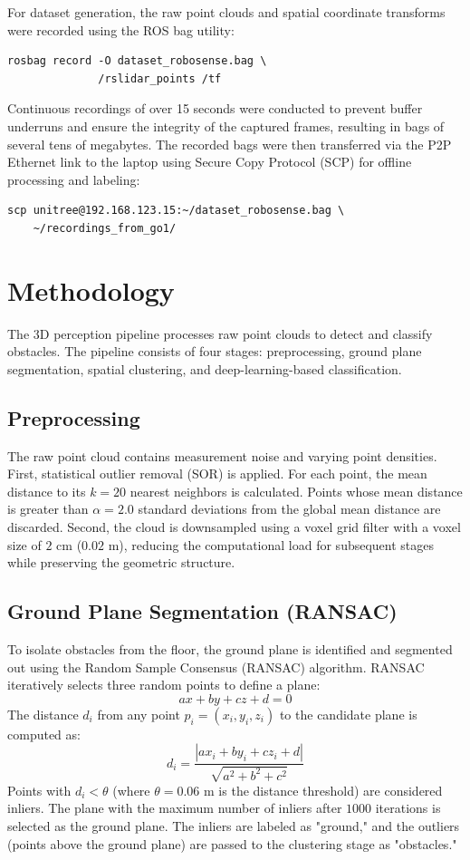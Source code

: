 \documentclass[a4paper,twocolumn]{article}
\begin{document}
For dataset generation, the raw point clouds and spatial coordinate transforms were recorded using the ROS bag utility:
\begin{verbatim}
rosbag record -O dataset_robosense.bag \
              /rslidar_points /tf
\end{verbatim}
Continuous recordings of over 15 seconds were conducted to prevent buffer underruns and ensure the integrity of the captured frames, resulting in bags of several tens of megabytes. The recorded bags were then transferred via the P2P Ethernet link to the laptop using Secure Copy Protocol (SCP) for offline processing and labeling:
\begin{verbatim}
scp unitree@192.168.123.15:~/dataset_robosense.bag \
    ~/recordings_from_go1/
\end{verbatim}

\section{Methodology}
The 3D perception pipeline processes raw point clouds to detect and classify obstacles. The pipeline consists of four stages: preprocessing, ground plane segmentation, spatial clustering, and deep-learning-based classification.

\subsection{Preprocessing}
The raw point cloud contains measurement noise and varying point densities. First, statistical outlier removal (SOR) is applied. For each point, the mean distance to its $k=20$ nearest neighbors is calculated. Points whose mean distance is greater than $\alpha = 2.0$ standard deviations from the global mean distance are discarded. Second, the cloud is downsampled using a voxel grid filter with a voxel size of $2\text{ cm}$ ($0.02\text{ m}$), reducing the computational load for subsequent stages while preserving the geometric structure.

\subsection{Ground Plane Segmentation (RANSAC)}
To isolate obstacles from the floor, the ground plane is identified and segmented out using the Random Sample Consensus (RANSAC) algorithm. RANSAC iteratively selects three random points to define a plane:
\begin{equation}\label{eq:plane}
ax + by + cz + d = 0
\end{equation}
The distance $d_i$ from any point $p_i = (x_i, y_i, z_i)$ to the candidate plane is computed as:
\begin{equation}\label{eq:distance}
d_i = \frac{|ax_i + by_i + cz_i + d|}{\sqrt{a^2 + b^2 + c^2}}
\end{equation}
Points with $d_i < \theta$ (where $\theta = 0.06\text{ m}$ is the distance threshold) are considered inliers. The plane with the maximum number of inliers after $1000$ iterations is selected as the ground plane. The inliers are labeled as "ground," and the outliers (points above the ground plane) are passed to the clustering stage as "obstacles."
\end{document}
